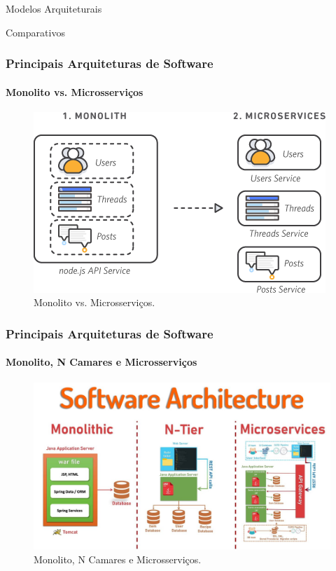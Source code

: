 \documentclass[
	10pt, %
	t, %
]{beamer}
\begin{document}
\begin{frame}
	\begin{center}
		
		\bigskip\bigskip\bigskip\bigskip %
		{\Large Modelos Arquiteturais}
		
		\bigskip\bigskip %
		{\Huge Comparativos}
		
	\end{center}

\end{frame}

\begin{frame}
	\frametitle{Principais Arquiteturas de Software}
	\framesubtitle{Monolito vs. Microsserviços}

	\begin{figure}
		\centering
		\includegraphics[width=0.9\linewidth]{Images/mono_x_micro.png}
		\caption{Monolito vs. Microsserviços.}\label{fig:monolito-vs-microservicos}
	\end{figure}

\end{frame}

\begin{frame}
	\frametitle{Principais Arquiteturas de Software}
	\framesubtitle{Monolito, N Camares e Microsserviços}

	\begin{figure}
		\centering
		\includegraphics[width=0.9\linewidth]{Images/arquit-comparativo.jpg}
		\caption{Monolito, N Camares e Microsserviços.}\label{fig:comparativo}
	\end{figure}

\end{frame}
\end{document}

